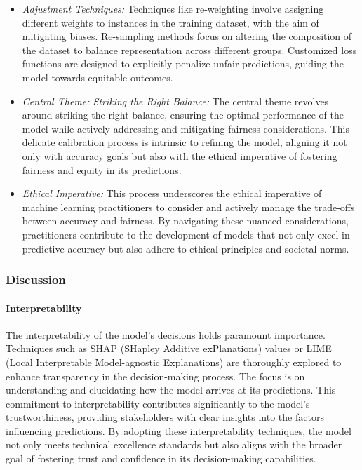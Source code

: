 \begin{itemize}

    \item \emph{Adjustment Techniques:} Techniques like re-weighting involve assigning different weights to instances in the training dataset, with the aim of mitigating biases. Re-sampling methods focus on altering the composition of the dataset to balance representation across different groups. Customized loss functions are designed to explicitly penalize unfair predictions, guiding the model towards equitable outcomes.

    \item \emph{Central Theme: Striking the Right Balance:} The central theme revolves around striking the right balance, ensuring the optimal performance of the model while actively addressing and mitigating fairness considerations. This delicate calibration process is intrinsic to refining the model, aligning it not only with accuracy goals but also with the ethical imperative of fostering fairness and equity in its predictions.

    \item \emph{Ethical Imperative:} This process underscores the ethical imperative of machine learning practitioners to consider and actively manage the trade-offs between accuracy and fairness. By navigating these nuanced considerations, practitioners contribute to the development of models that not only excel in predictive accuracy but also adhere to ethical principles and societal norms.

\end{itemize}

\subsubsection{Discussion}

\paragraph{Interpretability}

The interpretability of the model's decisions holds paramount importance. Techniques such as SHAP (SHapley Additive exPlanations) values or LIME (Local Interpretable Model-agnostic Explanations) are thoroughly explored to enhance transparency in the decision-making process. The focus is on understanding and elucidating how the model arrives at its predictions. This commitment to interpretability contributes significantly to the model's trustworthiness, providing stakeholders with clear insights into the factors influencing predictions. By adopting these interpretability techniques, the model not only meets technical excellence standards but also aligns with the broader goal of fostering trust and confidence in its decision-making capabilities.

